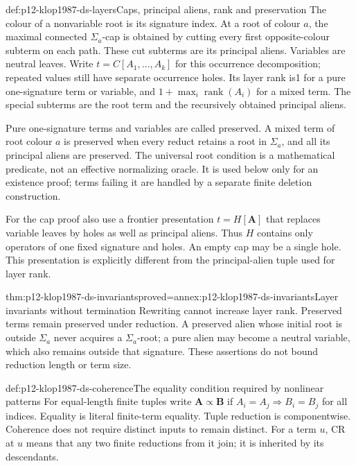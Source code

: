 \begin{hbdefinition}{def:p12-klop1987-ds-layers}{Caps, principal aliens, rank and preservation}
The colour of a nonvariable root is its signature index. At a root
of colour \(a\), the maximal connected \(\Sigma_a\)-cap is
obtained by cutting every first opposite-colour subterm on each
path. These cut subterms are its principal aliens. Variables are
neutral leaves. Write \(t=C[A_1,\ldots,A_k]\) for this occurrence
decomposition; repeated values still have separate occurrence holes.
Its layer rank is1 for a pure one-signature term or variable, and
\(1+\max_i\operatorname{rank}(A_i)\) for a mixed term.
The special subterms are the root term and the recursively obtained
principal aliens.

Pure one-signature terms and variables are called preserved.
A mixed term of root colour \(a\) is preserved when every reduct
retains a root in \(\Sigma_a\), and all its principal aliens are
preserved. The universal root condition is a mathematical predicate,
not an effective normalizing oracle. It is used below only for an
existence proof; terms failing it are handled by a separate finite
deletion construction.

For the cap proof also use a frontier presentation \(t=H[\mathbf A]\)
that replaces variable leaves by holes as well as principal aliens.
Thus \(H\) contains only operators of one fixed signature and
holes. An empty cap may be a single hole. This presentation is
explicitly different from the principal-alien tuple used for layer rank.
\end{hbdefinition}

\begin{hblemma}{thm:p12-klop1987-ds-invariants}{proved=annex:p12-klop1987-ds-invariants}{Layer invariants without termination}
Rewriting cannot increase layer rank. Preserved terms remain
preserved under reduction. A preserved alien whose initial root
is outside \(\Sigma_a\) never acquires a \(\Sigma_a\)-root;
a pure alien may become a neutral variable, which also remains
outside that signature. These assertions do not bound reduction
length or term size.
\end{hblemma}

\begin{hbdefinition}{def:p12-klop1987-ds-coherence}{The equality condition required by nonlinear patterns}
For equal-length finite tuples write \(\mathbf A\propto\mathbf B\)
if \(A_i=A_j\Rightarrow B_i=B_j\) for all indices. Equality
is literal finite-term equality. Tuple reduction is componentwise.
Coherence does not require distinct inputs to remain distinct.
For a term \(u\), CR at \(u\) means that any two finite
reductions from it join; it is inherited by its descendants.
\end{hbdefinition}

